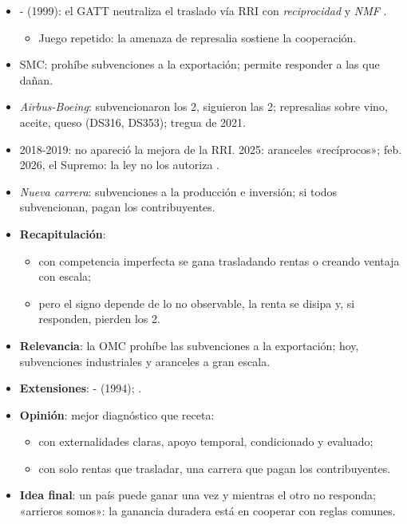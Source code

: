 \documentclass{article}
\begin{document}
\begin{columnas}
\begin{itemize}
\item {}- (1999): el GATT neutraliza el traslado vía RRI con \emph{reciprocidad} y \emph{NMF} .
  \begin{itemize}
  \item Juego repetido: la amenaza de represalia sostiene la cooperación.
  \end{itemize}
\item SMC: prohíbe subvenciones a la exportación; permite responder a las que dañan.
\item \emph{Airbus-Boeing}: subvencionaron los 2, siguieron las 2; represalias sobre vino, aceite, queso (DS316, DS353); tregua de 2021.
\item 2018-2019: no apareció la mejora de la RRI. 2025: aranceles «recíprocos»; feb. 2026, el Supremo: la ley no los autoriza .
\item \emph{Nueva carrera}: subvenciones a la producción e inversión; si todos subvencionan, pagan los contribuyentes.
\end{itemize}

\begin{itemize}
\item \textbf{Recapitulación}:
  \begin{itemize}
  \item con competencia imperfecta se gana trasladando rentas o creando ventaja con escala;
  \item pero el signo depende de lo no observable, la renta se disipa y, si responden, pierden los 2.
  \end{itemize}
\item \textbf{Relevancia}: la OMC prohíbe las subvenciones a la exportación; hoy, subvenciones industriales y aranceles a gran escala.
\item \textbf{Extensiones}: - (1994);    .
\item \textbf{Opinión}: mejor diagnóstico que receta:
  \begin{itemize}
  \item con externalidades claras, apoyo temporal, condicionado y evaluado;
  \item con solo rentas que trasladar, una carrera que pagan los contribuyentes.
  \end{itemize}
\item \textbf{Idea final}: un país puede ganar una vez y mientras el otro no responda; «arrieros somos»: la ganancia duradera está en cooperar con reglas comunes.
\end{itemize}


\end{columnas}
\end{document}
